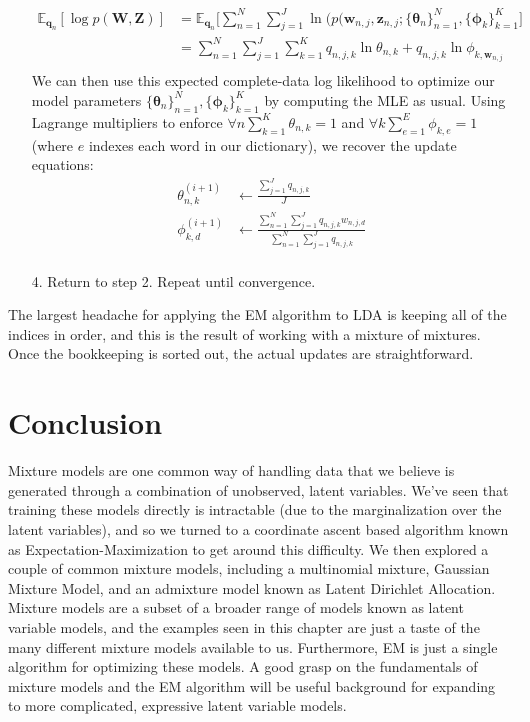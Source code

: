\begin{itemize}
        \begin{align*}
            \mathbb{E}_{\textbf{q}_n}[\log p(\textbf{W}, \textbf{Z})] &= \mathbb{E}_{\textbf{q}_n} \bigg[ \sum_{n=1}^{N} \sum_{j=1}^{J} \ln(p(\textbf{w}_{n, j}, \textbf{z}_{n, j}; \{\boldsymbol{\theta}_n \}_{n=1}^{N}, \{ \boldsymbol{\phi}_k\}_{k=1}^{K} \bigg] \\
            &= \sum_{n=1}^{N} \sum_{j=1}^{J} \sum_{k=1}^{K} q_{n, j, k} \ln \theta_{n, k} + q_{n, j, k} \ln \phi_{k, \textbf{w}_{n, j}} \\
        \end{align*}
        We can then use this expected complete-data log likelihood to optimize our model parameters $\{\boldsymbol{\theta}_n \}_{n=1}^{N}, \{ \boldsymbol{\phi}_k\}_{k=1}^{K}$ by computing the MLE as usual. Using Lagrange multipliers to enforce $\forall n \sum_{k=1}^{K} \theta_{n, k} = 1$ and $\forall k \sum_{e=1}^{E} \phi_{k, e} = 1$ (where $e$ indexes each word in our dictionary), we recover the update equations:
        \begin{align*}
            \theta_{n, k}^{(i + 1)} &\leftarrow \frac{\sum_{j=1}^{J} q_{n, j, k}}{J} \\
            \phi_{k, d}^{(i + 1)} &\leftarrow \frac{\sum_{n=1}^{N} \sum_{j=1}^{J} q_{n, j, k} w_{n, j, d}}{\sum_{n=1}^{N} \sum_{j=1}^{J} q_{n, j, k}} \\
        \end{align*}
    \item[4.] Return to step 2. Repeat until convergence.
\end{itemize}

The largest headache for applying the EM algorithm to LDA is keeping all of the indices in order, and this is the result of working with a mixture of mixtures. Once the bookkeeping is sorted out, the actual updates are straightforward.

\section{Conclusion}
Mixture models are one common way of handling data that we believe is generated through a combination of unobserved, latent variables. We've seen that training these models directly is intractable (due to the marginalization over the latent variables), and so we turned to a coordinate ascent based algorithm known as Expectation-Maximization to get around this difficulty. We then explored a couple of common mixture models, including a multinomial mixture, Gaussian Mixture Model, and an admixture model known as Latent Dirichlet Allocation. Mixture models are a subset of a broader range of models known as latent variable models, and the examples seen in this chapter are just a taste of the many different mixture models available to us. Furthermore, EM is just a single algorithm for optimizing these models. A good grasp on the fundamentals of mixture models and the EM algorithm will be useful background for expanding to more complicated, expressive latent variable models.
